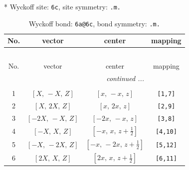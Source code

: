 \documentclass[fleqn,8pt]{jsarticle}
\begin{document}
* Wyckoff site: {\tt 6c}, site symmetry: {\tt .m.}
\renewcommand{\arraystretch}{1.2}
\begin{longtable}{cccc}
\caption{Wyckoff bond: {\tt 6a@6c}, bond symmetry: {\tt .m.}}
 \\
 \hline \hline
No. & vector & center & mapping \\ \hline \endfirsthead

\multicolumn{3}{l}{\tablename\ \thetable{}} \\
 \hline \hline
No. & vector & center & mapping \\ \hline \endhead

 \hline \hline
\multicolumn{3}{r}{\footnotesize\it continued ...} \\ \endfoot

 \hline \hline
\multicolumn{3}{r}{} \\ \endlastfoot

1 & $\left[ X,\, - X,\, Z \right]$ & $\left[ x,\, - x,\, z \right]$ & {\tt [1,7]} \\ \hline
2 & $\left[ X,\, 2 X,\, Z \right]$ & $\left[ x,\, 2 x,\, z \right]$ & {\tt [2,9]} \\ \hline
3 & $\left[ - 2 X,\, - X,\, Z \right]$ & $\left[ - 2 x,\, - x,\, z \right]$ & {\tt [3,8]} \\ \hline
4 & $\left[ - X,\, X,\, Z \right]$ & $\left[ - x,\, x,\, z + \frac{1}{2} \right]$ & {\tt [4,10]} \\ \hline
5 & $\left[ - X,\, - 2 X,\, Z \right]$ & $\left[ - x,\, - 2 x,\, z + \frac{1}{2} \right]$ & {\tt [5,12]} \\ \hline
6 & $\left[ 2 X,\, X,\, Z \right]$ & $\left[ 2 x,\, x,\, z + \frac{1}{2} \right]$ & {\tt [6,11]} \\
\end{longtable}
\renewcommand{\arraystretch}{1.2}
\end{document}
